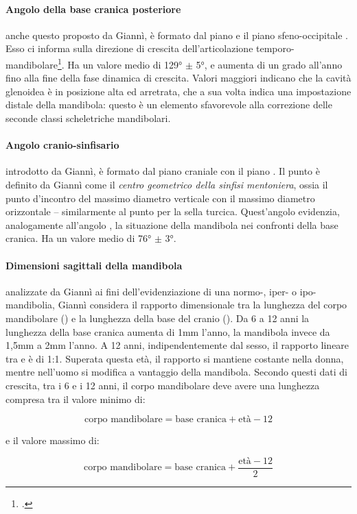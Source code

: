 \paragraph{Angolo della base cranica posteriore} anche questo proposto da Giannì, è formato dal piano  e il piano sfeno-occipitale . Esso ci informa sulla direzione di crescita dell'articolazione temporo-mandibolare\footcite{Ricketts1960}. Ha un valore medio di 129° $\pm$ 5°, e aumenta di un grado all'anno fino alla fine della fase dinamica di crescita. Valori maggiori indicano che la cavità glenoidea è in posizione alta ed arretrata, che a sua volta indica una impostazione distale della mandibola: questo è un elemento sfavorevole alla correzione delle seconde classi scheletriche mandibolari.

\paragraph{Angolo cranio-sinfisario} introdotto da Giannì, è formato dal piano craniale  con il piano . Il punto  è definito da Giannì come il \textit{centro geometrico della sinfisi mentoniera}, ossia il punto d'incontro del massimo diametro verticale con il massimo diametro orizzontale -- similarmente al punto  per la sella turcica. Quest'angolo evidenzia, analogamente all'angolo , la situazione della mandibola nei confronti della base cranica. Ha un valore medio di 76° $\pm$ 3°.

\paragraph{Dimensioni sagittali della mandibola} \label{sec:giannì_mandibola} analizzate da Giannì ai fini dell'e\-vi\-den\-zia\-zio\-ne di una normo-, iper- o ipo-mandibolia, Giannì considera il rapporto dimensionale tra la lunghezza del corpo mandibolare () e la lunghezza della base del cranio (). Da 6 a 12 anni la lunghezza della base cranica aumenta di 1mm l'anno, la mandibola invece da 1,5mm a 2mm l'anno. A 12 anni, indipendentemente dal sesso, il rapporto lineare tra  e  è di 1:1. Superata questa età, il rapporto si mantiene costante nella donna, mentre nell'uomo si modifica a vantaggio della mandibola. Secondo questi dati di crescita, tra i 6 e i 12 anni, il corpo mandibolare deve avere una lunghezza compresa tra il valore minimo di:
\begin{singlespace}
\[ \text{corpo mandibolare} = \text{base cranica} + \text{età} - 12 \]
\end{singlespace}
e il valore massimo di:
\begin{singlespace}
\[ \text{corpo mandibolare} = \text{base cranica} + \frac{\text{età} - 12}{2} \]
\end{singlespace}

